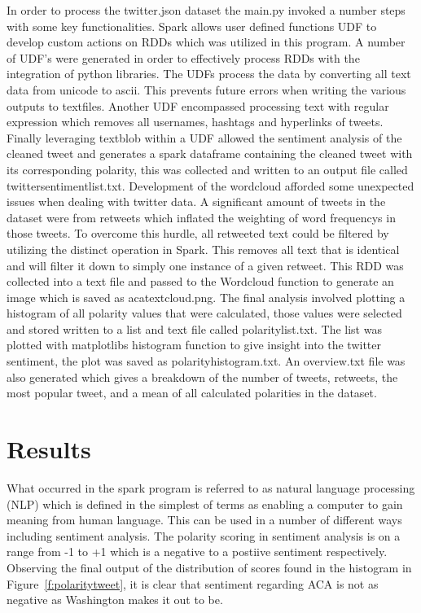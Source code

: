 In order to process the twitter.json dataset the main.py invoked a
number steps with some key functionalities.  Spark allows user defined
functions UDF to develop custom actions on RDDs which was utilized in
this program.  A number of UDF's were generated in order to
effectively process RDDs with the integration of python libraries.
The UDFs process the data by converting all text data from unicode to
ascii.  This prevents future errors when writing the various outputs
to textfiles.  Another UDF encompassed processing text with regular
expression which removes all usernames, hashtags and hyperlinks of
tweets.  Finally leveraging textblob within a UDF allowed the
sentiment analysis of the cleaned tweet and generates a spark
dataframe containing the cleaned tweet with its corresponding
polarity, this was collected and written to an output file called
twittersentimentlist.txt.  Development of the wordcloud afforded some
unexpected issues when dealing with twitter data.  A significant
amount of tweets in the dataset were from retweets which inflated the
weighting of word frequencys in those tweets.  To overcome this
hurdle, all retweeted text could be filtered by utilizing the distinct
operation in Spark.  This removes all text that is identical and will
filter it down to simply one instance of a given retweet.  This RDD
was collected into a text file and passed to the Wordcloud function to
generate an image which is saved as acatextcloud.png.  The final
analysis involved plotting a histogram of all polarity values that
were calculated, those values were selected and stored written to a
list and text file called polaritylist.txt.  The list was plotted with
matplotlibs histogram function to give insight into the twitter
sentiment, the plot was saved as polarityhistogram.txt.  An
overview.txt file was also generated which gives a breakdown of the
number of tweets, retweets, the most popular tweet, and a mean of all
calculated polarities in the dataset.




\section{Results}

What occurred in the spark program is referred to as natural language
processing (NLP) which is defined in the simplest of terms as enabling
a computer to gain meaning from human language.  This can be used in a
number of different ways including sentiment analysis.  The polarity
scoring in sentiment analysis is on a range from -1 to +1 which is a
negative to a postiive sentiment respectively.  Observing the final
output of the distribution of scores found in the histogram in
Figure~\ref{f:polaritytweet}, it is clear that sentiment regarding ACA
is not as negative as Washington makes it out to be.

